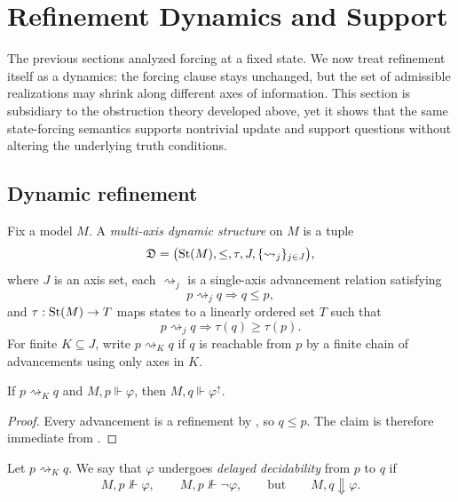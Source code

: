 \section{Refinement Dynamics and Support}\label{sec:multiaxis-refinement}

The previous sections analyzed forcing at a fixed state. We now treat refinement itself as a dynamics: the forcing clause stays unchanged, but the set of admissible realizations may shrink along different axes of information. This section is subsidiary to the obstruction theory developed above, yet it shows that the same state-forcing semantics supports nontrivial update and support questions without altering the underlying truth conditions.

\subsection{Dynamic refinement}

\begin{definition}\label{def:multi-axis-dynamic-structure}
Fix a model $M$. A \emph{multi-axis dynamic structure} on $M$ is a tuple
\[
\mathfrak{D}=\bigl(\mathrm{St}(M),\le,\tau,J,\{\rightsquigarrow_j\}_{j\in J}\bigr),
\]
where $J$ is an axis set, each $\rightsquigarrow_j$ is a single-axis advancement relation satisfying
\[
p\rightsquigarrow_j q \Longrightarrow q\le p,
\]
and $\tau:\mathrm{St}(M)\to T$ maps states to a linearly ordered set $T$ such that
\[
p\rightsquigarrow_j q \Longrightarrow \tau(q)\ge \tau(p).
\]
For finite $K\subseteq J$, write $p\rightsquigarrow_K q$ if $q$ is reachable from $p$ by a finite chain of advancements using only axes in $K$.
\end{definition}

\begin{proposition}\label{prop:updates-preserve-forcing}
If $p\rightsquigarrow_K q$ and $M,p\Vdash\varphi$, then $M,q\Vdash\varphi^\uparrow$.
\end{proposition}

\begin{proof}
Every advancement is a refinement by , so $q\le p$. The claim is therefore immediate from .
\end{proof}

\begin{definition}\label{def:delayed-decidability}
Let $p\rightsquigarrow_K q$. We say that $\varphi$ undergoes \emph{delayed decidability} from $p$ to $q$ if
\[
M,p\nVdash\varphi,\qquad
M,p\nVdash\neg\varphi,\qquad
\text{but}\qquad
M,q\Downarrow\varphi.
\]
\end{definition}

